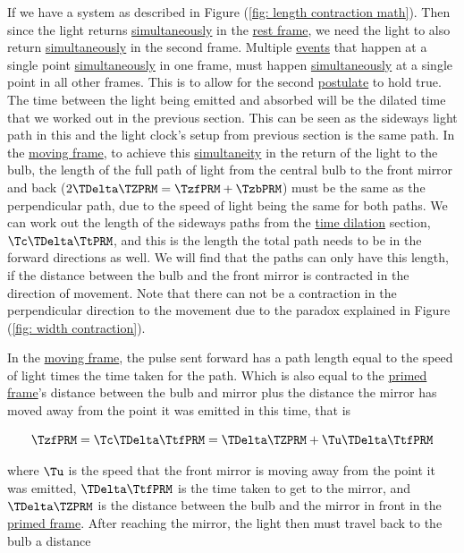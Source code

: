 If we have a system as described in Figure (\ref{fig: length contraction math}).
Then since the light returns \hyperlink{def-simultaneity}{simultaneously} in the \hyperlink{def-proper-frame}{rest frame}, we need the light to also return \hyperlink{def-simultaneity}{simultaneously} in the second frame.
Multiple \hyperlink{def-event}{events} that happen at a single point \hyperlink{def-simultaneity}{simultaneously} in one frame, must happen \hyperlink{def-simultaneity}{simultaneously} at a single point in all other frames.
This is to allow for the second \hyperlink{def-postulates}{postulate} to hold true.
The time between the light being emitted and absorbed will be the dilated time that we worked out in the previous section.
This can be seen as the sideways light path in this and the light clock's setup from previous section is the same path.
In the \hyperlink{def-Moving-Frame}{moving frame}, to achieve this \hyperlink{def-simultaneity}{simultaneity} in the return of the light to the bulb, the length of the full path of light from the central bulb to the front mirror and back ($2 {\TDelta  \TZPRM } = {\TzfPRM } + {\TzbPRM }$) must be the same as the perpendicular path, due to the speed of light being the same for both paths.
We can work out the length of the sideways paths from the \hyperlink{def-time-dilation}{time dilation} section, ${\Tc }{\TDelta  \TtPRM }$, and this is the length the total path needs to be in the forward directions as well.
We will find that the paths can only have this length, if the distance between the bulb and the front mirror is contracted in the direction of movement.
Note that there can not be a contraction in the perpendicular direction to the movement due to the paradox explained in Figure (\ref{fig: width contraction}).

In the \hyperlink{def-Moving-Frame}{moving frame}, the pulse sent forward has a path length equal to the speed of light times the time taken for the path.
Which is also equal to the \hyperlink{def-Primed-Frame}{primed frame}'s distance between the bulb and mirror plus the distance the mirror has moved away from the point it was emitted in this time, that is

\begin{equation}
	{\TzfPRM } = {\Tc }{\TDelta  \TtfPRM } = {\TDelta   \TZPRM } + {\Tu } {\TDelta  \TtfPRM }
\end{equation}

where ${\Tu }$ is the speed that the front mirror is moving away from the point it was emitted, ${\TDelta  \TtfPRM }$ is the time taken to get to the mirror, and ${\TDelta   \TZPRM }$ is the distance between the bulb and the mirror in front in the \hyperlink{def-Primed-Frame}{primed frame}.
After reaching the mirror, the light then must travel back to the bulb a distance

